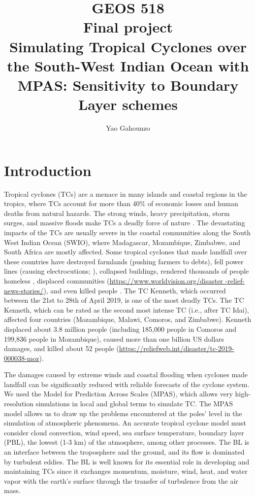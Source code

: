 \documentclass[8pt,a4paper]{article}
\title{\textbf{\LARGE GEOS 518} \\[1ex] Final project \\[1ex]  Simulating Tropical Cyclones over the South-West Indian Ocean with MPAS: Sensitivity to Boundary Layer schemes}
\author{Yao Gahounzo}
\begin{document}
	
	
	
	\maketitle
	
	
	
	
	\section{Introduction} 
	
	Tropical cyclones (TCs) are a menace in many islands and coastal regions in the tropics, where TCs account for more than 40\% of economic losses and human deaths from natural hazards. The strong winds, heavy precipitation, storm surges, and massive floods make TCs a deadly force of nature \citep{oguejiofor2019simulating}. The devastating impacts of the TCs are usually severe in the coastal communities along the South West Indian Ocean (SWIO), where Madagascar, Mozambique, Zimbabwe, and South Africa are mostly affected. Some tropical cyclones that made landfall over these countries have destroyed farmlands (pushing farmers to debts), fell power lines (causing electrocutions; \citep{oguejiofor2019simulating}), collapsed buildings, rendered thousands of people homeless \citep{fitchett201466}, displaced communities (\url{https://www.worldvision.org/disaster -relief-news-stories/}), and even killed people \citep{fitchett201466}. The TC Kenneth, which occurred between the 21st to  28th of April 2019, is one of the most deadly TCs. The TC Kenneth, which can be rated as the second most intense TC (i.e., after TC Idai), affected four countries (Mozambique, Malawi, Comoros, and Zimbabwe). Kenneth displaced about 3.8 million people (including 185,000 people in Comoros and 199,836 people in Mozambique), caused more than one billion US dollars damages, and killed about 52 people (\url{https://reliefweb.int/disaster/tc-2019-000038-moz}).
	
	
	The damages caused by extreme winds and coastal flooding when cyclones made landfall \citep{singh2017impact} can be significantly reduced with reliable forecasts of the cyclone system. We used the Model for Prediction Across Scales (MPAS), which allows very high-resolution simulations in local and global terms to simulate TC. The MPAS model allows us to draw up the problems encountered at the poles' level in the simulation of atmospheric phenomena.  An accurate tropical cyclone model must consider cloud convection, wind speed, sea surface temperature, boundary layer (PBL), the lowest (1-3 km) of the atmosphere, among other processes. The BL is an interface between the troposphere and the ground, and its flow is dominated by turbulent eddies. The BL is well known for its essential role in developing and maintaining TCs since it exchanges momentum, moisture, wind, heat, and water vapor with the earth's surface through the transfer of turbulence from the air mass.
	
\end{document}
